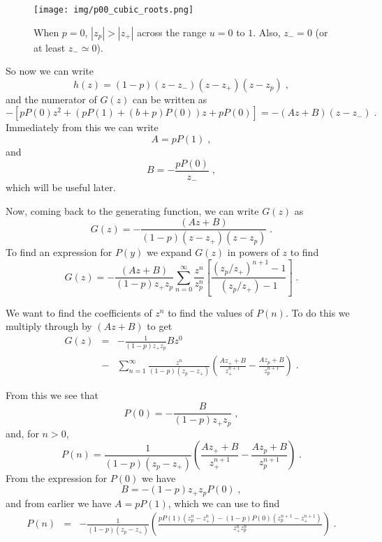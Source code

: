 \documentclass[a4paper,10pt]{article}
\begin{document}
\begin{figure}[h!]
 \centering
 \texttt{[image: img/p00\_cubic\_roots.png]}
 \caption{When $p=0$, $|z_p|>|z_+|$ across the range $u = 0 $ to $1$. Also, $z_- = 0$ (or at least $z_- \simeq 0$).}
 \label{fig:p00_cubic_roots}
\end{figure}


So now we can write
\begin{equation}
  h(z) = (1-p)(z-z_-)(z-z_+)(z-z_p)\;, 
\end{equation}
and the numerator of $G(z)$ can be written as
\begin{equation}
  - \left[ pP(0) z^2 + \left( pP(1) + (b+p)P(0) \right) z + pP(0) \right] = -(Az+B)(z-z_-) \;.
\end{equation}
Immediately from this we can write
\begin{equation}
  A = pP(1) \;, 
\end{equation}
and
\begin{equation}
  B = -\frac{pP(0)}{z_-} \;,
\end{equation}
which will be useful later.

Now, coming back to the generating function, we can write $G(z)$ as 
\begin{equation}
  G(z) = - \frac{(Az + B)}{(1-p)(z-z_+)(z-z_p)} \;.
\end{equation}
To find an expression for $P(y)$ we expand $G(z)$ in powers of $z$ to find
\begin{equation}
 G(z) = - \frac{(Az + B)}{(1-p)z_+z_p} \sum_{n=0}^\infty \frac{z^n}{z_p^n} \left[ \frac{ (z_p/z_+)^{n+1} -1 }{(z_p/z_+) - 1} \right] \;.
\end{equation}

We want to find the coefficients of $z^n$ to find the values of $P(n)$. To do this we multiply through by $(Az + B)$ to get
\begin{eqnarray}
 G(z) &=& -\frac{1}{(1-p)z_+z_p} Bz^0 \nonumber \\ 
        &-& \sum_{n=1}^\infty\frac{ z^n}{(1-p)(z_p-z_+)} \left( \frac{Az_++B}{z_+^{n+1}} - \frac{Az_p+B}{z_p^{n+1}} \right) \;.
\end{eqnarray}

From this we see that
\begin{equation}
 P(0) = - \frac{B}{(1-p)z_+z_p} \;,
\end{equation}
and, for $n>0$, 
\begin{equation}
 P(n) = \frac{ 1}{(1-p)(z_p-z_+)} \left( \frac{Az_++B}{z_+^{n+1}} - \frac{Az_p+B}{z_p^{n+1}} \right) \;. 
\end{equation}
From the expression for $P(0)$ we have
\begin{equation}
  B = -(1-p)z_+z_pP(0) \;,
\end{equation}
and from earlier we have $A = pP(1)$, which we can use to find
\begin{eqnarray}
 P(n) &=& -\frac{1}{(1-p)(z_p-z_+)} \left( \frac{pP(1)(z_p^n-z_+^n) -(1-p)P(0)(z_p^{n+1} -z_+^{n+1})}{z_+^n z_p^n} \right) \;.
\end{eqnarray}
\end{document}
